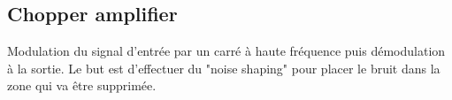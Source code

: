 \documentclass[resume]{subfiles}
\begin{document}
\begin{multicols}{3}
\subsection{Chopper amplifier}
Modulation du signal d'entrée par un carré à haute fréquence puis démodulation à la sortie. Le but est d'effectuer du "noise shaping" pour placer le bruit dans la zone qui va être supprimée.

\end{multicols}
\end{document}
